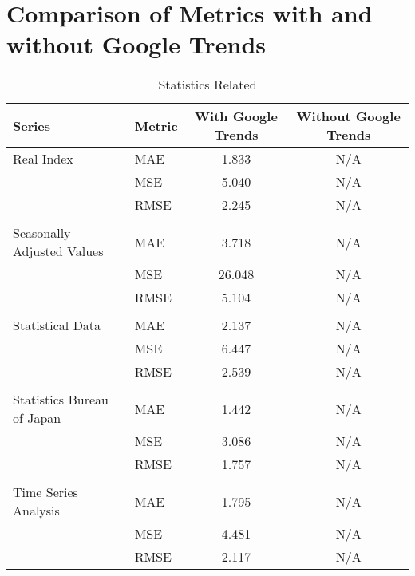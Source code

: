 \documentclass[a4paper,12pt]{article}
\begin{document}
\section*{Comparison of Metrics with and without Google Trends}

\begin{table}
\caption{Statistics Related}
\label{tab:metrics_comparison_Statistics_Related}
\begin{tabular}{llcc}
\toprule
Series & Metric & With Google Trends & Without Google Trends \\
\midrule
Real Index & MAE & 1.833 & N/A \\
 & MSE & 5.040 & N/A \\
 & RMSE & 2.245 & N/A \\
\arrayrulecolor{black!30}\midrule &  &  &  \\
Seasonally Adjusted Values & MAE & 3.718 & N/A \\
 & MSE & 26.048 & N/A \\
 & RMSE & 5.104 & N/A \\
\arrayrulecolor{black!30}\midrule &  &  &  \\
Statistical Data & MAE & 2.137 & N/A \\
 & MSE & 6.447 & N/A \\
 & RMSE & 2.539 & N/A \\
\arrayrulecolor{black!30}\midrule &  &  &  \\
Statistics Bureau of Japan & MAE & 1.442 & N/A \\
 & MSE & 3.086 & N/A \\
 & RMSE & 1.757 & N/A \\
\arrayrulecolor{black!30}\midrule &  &  &  \\
Time Series Analysis & MAE & 1.795 & N/A \\
 & MSE & 4.481 & N/A \\
 & RMSE & 2.117 & N/A \\
\bottomrule
\end{tabular}
\end{table}
\end{document}
